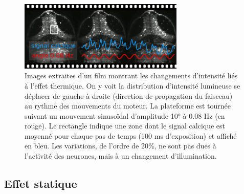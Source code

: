 
\begin{figure}
    \centering
    \includegraphics[width=0.7\textwidth]{./files/water_instability.svg.png}
    \caption{Images extraites d'un film montrant les changements d'intensité liés à l'effet thermique. On y voit la distribution d'intensité lumineuse se déplacer de gauche à droite (direction de propagation du faisceau) au rythme des mouvements du moteur. La plateforme est tournée suivant un mouvement sinusoïdal d'amplitude 10° à 0.08 Hz (en rouge). Le rectangle indique une zone dont le signal calcique est moyenné pour chaque pas de temps (100 ms d'exposition) et affiché en bleu. Les variations, de l'ordre de 20\%, ne sont pas dues à l'activité des neurones, mais à un changement d'illumination.
    \label{FIGwaterinstability}}
    \end{figure}




\subsection{Effet statique}


